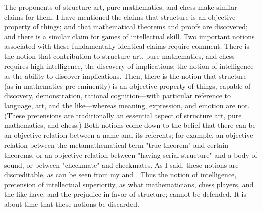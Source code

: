 The proponents of structure art, pure mathematics, and chess make similar claims 
for them. I have mentioned the claims that structure is an objective property of things; 
and that mathematical theorems and proofs are discovered; and there is a similar claim for 
games of intellectual skill. Two important notions associated with these fundamentally 
identical claims require comment. There is the notion that contribution to structure 
art, pure mathematics, and chess requires high intelligence, the discovery of implications; 
the notion of intelligence as the ability to discover implications. Then, there is the 
notion that structure (as in mathematics pre-eminently) is an objective property of things, 
capable of discovery, demonstration, rational cognition---with particular reference 
to language, art, and the like---whereas meaning, expression, and emotion are not. 
(These pretensions are traditionally an essential aspect of structure art, pure mathematics, 
and chess.) Both notions come down to the belief that there can be an objective relation 
between a name and its referents; for example, an objective relation between the 
metamathematical term "true theorem" and certain theorems, or an objective relation 
between "having serial structure" and a body of sound, or between "checkmate" and 
checkmates. As I said, these notions are discreditable, as can be seen from my 
 and . Thus the notion of intelligence, pretension 
of intellectual superiority, as what mathematicians, chess players, and the like have; 
and the prejudice in favor of structure; cannot be defended. It is about time that 
these notions be discarded. 


